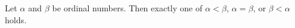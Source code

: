 Let \(\alpha\) and \(\beta\) be ordinal numbers. Then exactly one of \(\alpha < \beta\), \(\alpha = \beta\), or \(\beta < \alpha\) holds.
